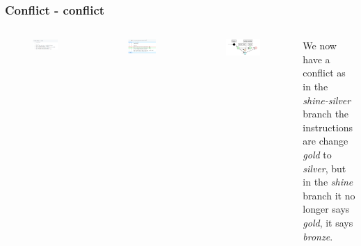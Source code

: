 \documentclass[aspectratio=169]{beamer} %
\begin{document}
\begin{frame}
	\frametitle{Conflict - conflict}
	\begin{columns}[c]
		
		\vspace{-.6cm}
		\begin{figure}
			\centering
			\includegraphics[width=.9\textwidth]{./img/conflict-img-conflict.png}
		\end{figure}
		\vspace{-.3cm}
		\begin{figure}
			\centering
			\includegraphics[width=.9\textwidth]{./img/conflict-img-commits-2.png}
		\end{figure}
		
		
		\vspace{-.6cm}
		\begin{figure}
			\centering
			\includegraphics[width=.9\textwidth]{./img/conflict-network-conflict.png}
		\end{figure}
		
		\vspace{.5cm}
		
		We now have a conflict as in the \textit{shine-silver} branch
		the instructions are change \textit{gold} to \textit{silver},
		but in the \textit{shine} branch 
		it no longer says \textit{gold}, it says \textit{bronze}.
		
	\end{columns}
\end{frame}
\end{document}
